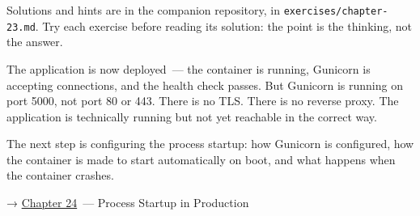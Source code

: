 \noindent{}Solutions and hints are in the companion repository, in \texttt{exercises/}\allowbreak{}\texttt{chapter-23.md}. Try each exercise before reading its solution: the point is the thinking, not the answer.

\label{23-code-transfer:whats-next}

The application is now deployed~--- the container is running, Gunicorn is accepting connections, and the health check passes. But Gunicorn is running on port 5000, not port 80 or 443. There is no TLS. There is no reverse proxy. The application is technically running but not yet reachable in the correct way.

The next step is configuring the process startup: how Gunicorn is configured, how the container is made to start automatically on boot, and what happens when the container crashes.

\noindent{}→ \hyperref[ch:24-process-startup]{Chapter 24}~--- Process Startup in Production
